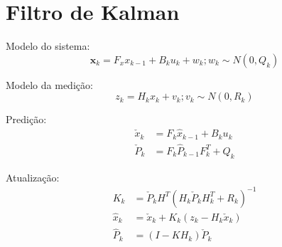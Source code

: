 \section{Filtro de Kalman}



Modelo do sistema:
\begin{equation}
\textbf{x}_k = F_x x_{k-1} + B_k u_k + w_k; w_k \sim N(0, Q_k)
\end{equation}

Modelo da medição:
\begin{equation}
z_k = H_k x_k + v_k; v_k \sim N(0, R_k)
\end{equation}

Predição:
\begin{align*}
    \check{x}_k &= F_k \hat{x}_{k-1} + B_k u_k\\
    \check{P}_k &= F_k \hat{P}_{k-1} F^T_k + Q_k
\end{align*}

Atualização:
\begin{align*}
    K_k &= \check{P}_k H^T \left( H_k \check{P}_k H^T_k + R_k\right)^{-1}\\
    \hat{x}_k &= \check{x}_k + K_k\left( z_k - H_k \check{x}_k \right)\\
    \hat{P}_k &= \left(I - KH_k \right)\check{P}_k
\end{align*}